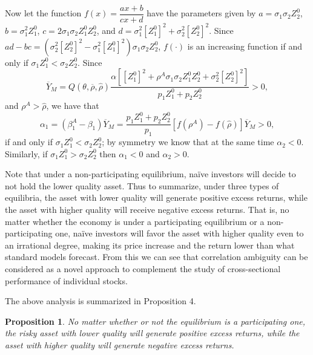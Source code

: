 \documentclass[10pt]{article}
\newtheorem{prop}{Proposition}
\begin{document}
Now let the function $ f (x) = \dfrac{a x + b}{c x + d} $ have the parameters given by $ a = \sigma_1 \sigma_2 Z_2^0 $, $ b = \sigma_1^2 Z_1^0 $, $ c = 2 \sigma_1 \sigma_2 Z_1^0 Z_2^0 $, and $ d = \sigma_1^2 \left[ Z_1^0 \right]^2 + \sigma_2^2 \left[ Z_2^0 \right]^2 $. Since $ a d - b c = \left( \sigma_2^2 \left[ Z_2^0 \right]^2 - \sigma_1^2 \left[ Z_1^0 \right]^2 \right) \sigma_1 \sigma_2 Z_2^0 $, $ f (\cdot) $ is an increasing function if and only if $ \sigma_1 Z_1^0 < \sigma_2 Z_2^0 $. Since 
\begin{equation*}
\overline{Y}_M = Q (\theta, \overline{\rho}, {\hat \rho}) \dfrac{\alpha \left[ \left[ Z_1^0 \right]^2 + \rho^A \sigma_1 \sigma_2 Z_1^0 Z_2^0 + \sigma_2^2 \left[ Z_2^0 \right]^2 \right]}{p_1 Z_1^0 + p_2 Z_2^0} > 0, 
\end{equation*}
and $ \rho^A > \hat{\rho} $, we have that 
\begin{equation*}
\alpha_1 = (\beta_1^A - \beta_1) \overline{Y}_M = \dfrac{p_1 Z_1^0 + p_2 Z_2^0}{p_1} \left[ f (\rho^A) - f (\hat{\rho}) \right]\overline{Y}_M > 0,
\end{equation*}
if and only if $ \sigma_1 Z_1^0 < \sigma_2 Z_2^0 $; by symmetry we know that at the same time $ \alpha_2 < 0 $. Similarly, if $ \sigma_1 Z_1^0 > \sigma_2 Z_2^0 $ then $ \alpha_1 < 0 $ and $ \alpha_2 > 0 $. 

Note that under a non-participating equilibrium, na\"ive investors will decide to not hold the lower quality asset. Thus to summarize, under three types of equilibria, the asset with lower quality will generate positive excess returns, while the asset with higher quality will receive negative excess returns. That is, no matter whether the economy is under a participating equilibrium or a non-participating one, na\"ive investors will favor the asset with higher quality even to an irrational degree, making its price increase and the return lower than what standard models forecast. From this we can see that correlation ambiguity can be considered as a novel approach to complement the study of cross-sectional performance of individual stocks. 

The above analysis is summarized in Proposition 4. 

\begin{prop}
No matter whether or not the equilibrium is a participating one, the risky asset with lower quality will generate positive excess returns, while the asset with higher quality will generate negative excess returns.
\end{prop}
\end{document}
